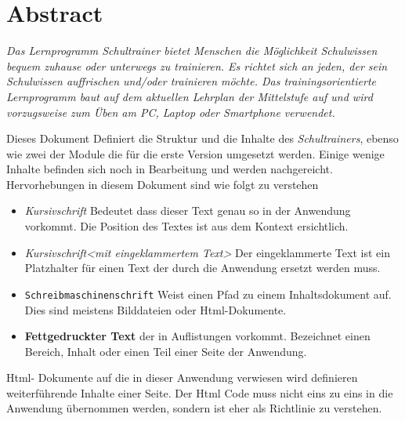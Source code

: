 \chapter{ Abstract }
\label{cha:abstract}
\emph{Das Lernprogramm \emph{Schultrainer} bietet Menschen die Möglichkeit Schulwissen
bequem zuhause oder unterwegs zu trainieren.
Es richtet sich an jeden, der sein Schulwissen auffrischen
und/oder trainieren möchte. Das trainingsorientierte Lernprogramm baut auf dem
aktuellen Lehrplan der Mittelstufe auf und wird vorzugsweise zum Üben am PC,
Laptop oder Smartphone verwendet.}



Dieses Dokument Definiert die Struktur und die Inhalte des \emph{Schultrainers}, ebenso wie zwei der Module die für die erste Version umgesetzt werden. 
Einige wenige Inhalte befinden sich noch in Bearbeitung und werden nachgereicht. 
Hervorhebungen in diesem Dokument sind wie folgt zu verstehen
\begin{itemize}
  \item \emph{Kursivschrift} Bedeutet dass dieser Text genau so in der Anwendung vorkommt. Die Position des Textes ist aus dem Kontext ersichtlich.
  \item \emph{Kursivschrift<mit eingeklammertem Text>} Der eingeklammerte Text ist ein Platzhalter für einen Text der durch die Anwendung ersetzt werden muss.
 \item \texttt{Schreibmaschinenschrift} Weist einen Pfad zu einem Inhaltsdokument auf. Dies sind meistens Bilddateien oder Html-Dokumente. 
 \item \textbf{Fettgedruckter Text} der in Auflistungen vorkommt. Bezeichnet einen Bereich, Inhalt oder einen Teil einer Seite der Anwendung.
\end{itemize}
Html- Dokumente auf die in dieser Anwendung verwiesen wird definieren weiterführende Inhalte einer Seite. 
Der Html Code muss nicht eins zu eins in die Anwendung übernommen werden, sondern ist eher als Richtlinie zu verstehen.
